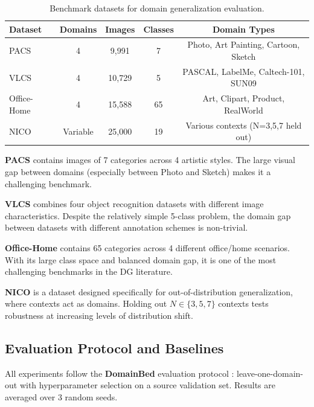 \documentclass[12pt,a4paper]{article}
\begin{document}
\begin{table}[H]
  \centering
  \caption{Benchmark datasets for domain generalization evaluation.}
  \label{tab:datasets}
  \begin{tabular}{@{}lcccc@{}}
    \toprule
    \textbf{Dataset} & \textbf{Domains} & \textbf{Images} & \textbf{Classes}
      & \textbf{Domain Types} \\
    \midrule
    PACS        & 4 & 9,991  & 7  & Photo, Art Painting, Cartoon, Sketch \\
    VLCS        & 4 & 10,729 & 5  & PASCAL, LabelMe, Caltech-101, SUN09 \\
    Office-Home & 4 & 15,588 & 65 & Art, Clipart, Product, RealWorld \\
    NICO        & Variable & 25,000 & 19 & Various contexts (N=3,5,7 held out) \\
    \bottomrule
  \end{tabular}
\end{table}

\textbf{PACS} \citep{li2017} contains images of 7 categories across 4 artistic styles.
The large visual gap between domains (especially between Photo and Sketch) makes it a
challenging benchmark.

\textbf{VLCS} \citep{torralba2011} combines four object recognition datasets with different
image characteristics. Despite the relatively simple 5-class problem, the domain gap
between datasets with different annotation schemes is non-trivial.

\textbf{Office-Home} \citep{venkateswara2017} contains 65 categories across 4 different
office/home scenarios. With its large class space and balanced domain gap, it is one of
the most challenging benchmarks in the DG literature.

\textbf{NICO} \citep{he2021} is a dataset designed specifically for out-of-distribution
generalization, where contexts act as domains. Holding out $N \in \{3,5,7\}$ contexts
tests robustness at increasing levels of distribution shift.

\subsection{Evaluation Protocol and Baselines}

All experiments follow the \textbf{DomainBed} evaluation protocol \citep{gulrajani2021}:
leave-one-domain-out with hyperparameter selection on a source validation set.
Results are averaged over 3 random seeds.
\end{document}
